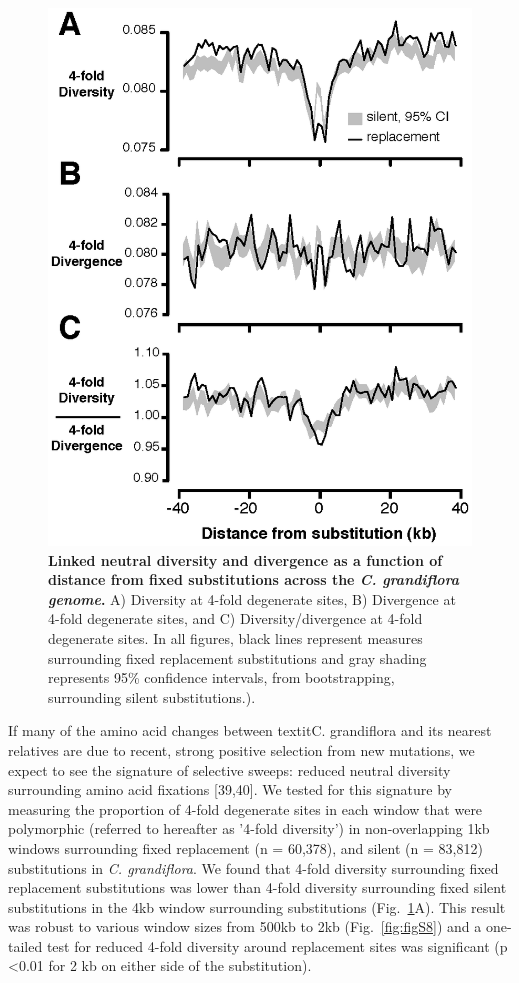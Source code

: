 \begin{figure}[h]
      \centering
       \includegraphics{Ch2Fig2}
    \caption{\textbf{Linked neutral diversity and divergence as a function of distance from fixed substitutions across the \textit{C. grandiflora genome}.} A) Diversity at 4-fold degenerate sites, B) Divergence at 4-fold degenerate sites, and C) Diversity/divergence at 4-fold degenerate sites. In all figures, black lines represent measures surrounding fixed replacement substitutions and gray shading represents 95\% confidence intervals, from bootstrapping, surrounding silent substitutions.).}
    \label{fig:fig2}
\end{figure}

If many of the amino acid changes between textit{C. grandiflora} and its nearest relatives are due to recent, strong positive selection from new mutations, we expect to see the signature of selective sweeps: reduced neutral diversity surrounding amino acid fixations [39,40]. We tested for this signature by measuring the proportion of 4-fold degenerate sites in each window that were polymorphic (referred to hereafter as '4-fold diversity') in non-overlapping 1kb windows surrounding fixed replacement (n = 60,378), and silent (n = 83,812) substitutions in \textit{C. grandiflora}. We found that 4-fold diversity surrounding fixed replacement substitutions was lower than 4-fold diversity surrounding fixed silent substitutions in the 4kb window surrounding substitutions (Fig.~\ref{fig:fig2}A). This result was robust to various window sizes from 500kb to 2kb (Fig.~\ref{fig:figS8}) and a one-tailed test for reduced 4-fold diversity around replacement sites was significant (p \textless  0.01 for 2 kb on either side of the substitution).

